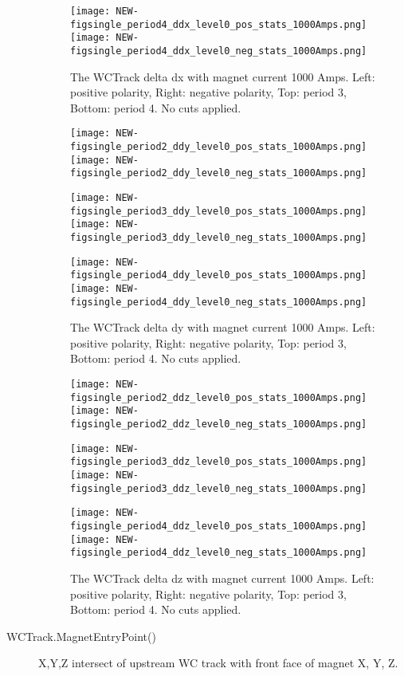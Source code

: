 \begin{description}
{\begin{figure}[h]
 	\texttt{[image: NEW-figsingle\_period4\_ddx\_level0\_pos\_stats\_1000Amps.png]}
	 \texttt{[image: NEW-figsingle\_period4\_ddx\_level0\_neg\_stats\_1000Amps.png]}
   \caption[short]{The WCTrack delta dx with magnet current 1000 Amps. Left: positive polarity, Right: negative polarity, Top: period 3, Bottom: period 4. No cuts applied.}
   \label{fig_ddx}
  \end{figure}
  
  
   \begin{figure}[h]	 
   
      	\texttt{[image: NEW-figsingle\_period2\_ddy\_level0\_pos\_stats\_1000Amps.png]}
	 \texttt{[image: NEW-figsingle\_period2\_ddy\_level0\_neg\_stats\_1000Amps.png]}
	 
   	\texttt{[image: NEW-figsingle\_period3\_ddy\_level0\_pos\_stats\_1000Amps.png]}
	 \texttt{[image: NEW-figsingle\_period3\_ddy\_level0\_neg\_stats\_1000Amps.png]}
	 
 	\texttt{[image: NEW-figsingle\_period4\_ddy\_level0\_pos\_stats\_1000Amps.png]}
	 \texttt{[image: NEW-figsingle\_period4\_ddy\_level0\_neg\_stats\_1000Amps.png]}
   \caption[short]{The WCTrack delta dy with magnet current 1000 Amps. Left: positive polarity, Right: negative polarity, Top: period 3, Bottom: period 4. No cuts applied.}
   \label{fig_ddy}
  \end{figure}
  
     \begin{figure}[h]	 
     
        	\texttt{[image: NEW-figsingle\_period2\_ddz\_level0\_pos\_stats\_1000Amps.png]}
	 \texttt{[image: NEW-figsingle\_period2\_ddz\_level0\_neg\_stats\_1000Amps.png]}
	 
   	\texttt{[image: NEW-figsingle\_period3\_ddz\_level0\_pos\_stats\_1000Amps.png]}
	 \texttt{[image: NEW-figsingle\_period3\_ddz\_level0\_neg\_stats\_1000Amps.png]}
	 
 	\texttt{[image: NEW-figsingle\_period4\_ddz\_level0\_pos\_stats\_1000Amps.png]}
	 \texttt{[image: NEW-figsingle\_period4\_ddz\_level0\_neg\_stats\_1000Amps.png]}
   \caption[short]{The WCTrack delta dz with magnet current 1000 Amps. Left: positive polarity, Right: negative polarity, Top: period 3, Bottom: period 4. No cuts applied.}
   \label{fig_ddz}
  \end{figure}

}
\item[WCTrack.MagnetEntryPoint()]{
X,Y,Z intersect of upstream WC track with front face of magnet  X, Y, Z.

}
\end{description}
